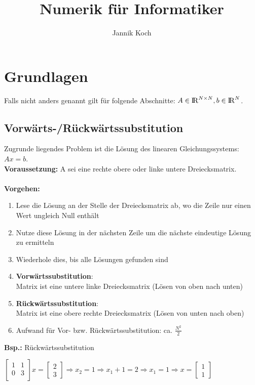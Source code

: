 \documentclass[10pt,a4paper]{article}
\author{Jannik Koch}
\title{Numerik für Informatiker}
\def\realnumbers{{\rm I\!R}}
\begin{document}
	{\let\newpage\relax\maketitle}
	\tableofcontents
	\newpage
	\setcounter{page}{1}

	\section{Grundlagen}
	Falls nicht anders genannt gilt für folgende Abschnitte: $A \in \realnumbers^{N \times N}, b \in \realnumbers^N$.
	
	\subsection{Vorwärts-/Rückwärtssubstitution}
	Zugrunde liegendes Problem ist die Lösung des linearen Gleichungssystems: $Ax = b$.\\
	\textbf{Voraussetzung:} A sei eine rechte obere oder linke untere Dreiecksmatrix.\\\\
	\textbf{Vorgehen:}
	\begin{enumerate}
		\item Lese die Lösung an der Stelle der Dreiecksmatrix ab, wo die Zeile nur einen Wert ungleich Null enthält
		\item Nutze diese Lösung in der nächsten Zeile um die nächste eindeutige Lösung zu ermitteln
		\item Wiederhole dies, bis alle Lösungen gefunden sind
		\item \textbf{Vorwärtssubstitution}:\\Matrix ist eine untere linke Dreiecksmatrix (Lösen von oben nach unten)
		\item \textbf{Rückwärtssubstitution}:\\Matrix ist eine obere rechte Dreiecksmatrix (Lösen von unten nach oben)
		\item Aufwand für Vor- bzw. Rückwärtssubstitution: ca. $\frac{N^2}{2}$
	\end{enumerate}

	\textbf{Bsp.:} Rückwärtssubstitution
	\begin{center}
		$\begin{bmatrix} 1 & 1\\0 & 3\\\end{bmatrix}x = \begin{bmatrix}2 \\ 3\end{bmatrix} \Rightarrow
		x_2 = 1 \Rightarrow x_1 + 1 = 2 \Rightarrow x_1 = 1 \Rightarrow x = \begin{bmatrix}1 \\ 1\end{bmatrix}$
	\end{center}
	
\end{document}
